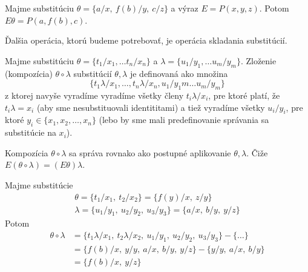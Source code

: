 \begin{priklad}
    Majme substitúciu $\theta=\{a/x,\ f(b)/y,\ c/z\}$
    a výraz $E = P(x, y, z)$.
    Potom $E\theta = P(a, f(b), c)$.
\end{priklad}

\medskip
\noindent
Ďalšia operácia, ktorú budeme potrebovať, je operácia skladania
substitúcií.

\begin{definicia}
    Majme substitúciu $\theta = \{t_1/x_1, \ldots t_n/x_n\}$ a
    $\lambda = \{ u_1/y_1, \ldots u_m/y_m \}$.
    Zloženie (kompozícia) $\theta \circ \lambda$ substitúcií
    $\theta,\lambda$ je definovaná ako množina
    \begin{equation*}
        \{t_1 \lambda/x_1, \dots, t_n \lambda/x_n, u_1/y_1m \dots u_m/y_m \}
    \end{equation*}
    z ktorej navyše vyradíme vyradíme všetky členy $t_i\lambda/x_i$,
    pre ktoré platí, že $t_i \lambda = x_i$ (aby sme nesubstituovali
    identititami)
    a tiež vyradíme všetky $u_i/y_i$,
    pre ktoré $y_i \in \{x_1, x_2, \dots, x_n\}$ (lebo by sme mali
    predefinovanie správania sa substitúcie na $x_i$).
\end{definicia}

\begin{poznamka}
    Kompozícia $\theta \circ \lambda$ sa správa rovnako ako postupné
    aplikovanie $\theta, \lambda$. Čiže
    $E(\theta \circ \lambda) = (E\theta)\lambda$.
\end{poznamka}

\begin{priklad}
    Majme substitúcie
    \begin{align*}
        \theta = \{t_1/x_1,\ t_2/x_2\} = \{ f(y)/x,\ z/y\} \\
        \lambda = \{u_1/y_1,\ u_2/y_2,\ u_3/y_3\} = \{ a/x,\ b/y,\ y/z\}
    \end{align*}
    Potom
    \begin{equation*}
    \begin{split}
        \theta \circ \lambda &= 
            \{ t_1 \lambda / x_1,\ t_2\lambda/x_2,\
            u_1/y_1,\ u_2/y_2,\ u_3/y_3\} - \{\dots\} \\ 
        &= \{f(b)/x,\ y/y,\ a/x,\ b/y,\ y/z\} - \{y/y,\ a/x,\ b/y\} \\
        &= \{f(b)/x,\ y/z\}
    \end{split}
    \end{equation*}
\end{priklad}

